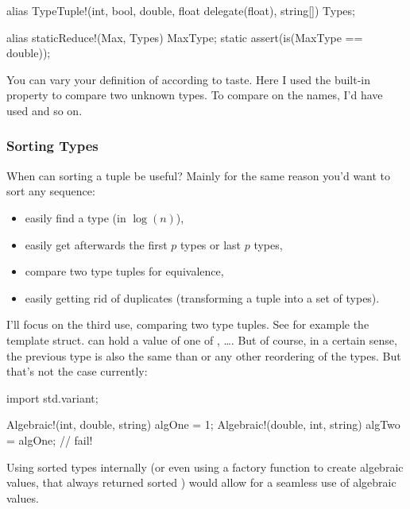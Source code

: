 \begin{dcode}
alias TypeTuple!(int, bool, double, float delegate(float), string[]) Types;

alias staticReduce!(Max, Types) MaxType;
static assert(is(MaxType == double));
\end{dcode}

You can vary your definition of  according to taste. Here I used the built-in  property to compare two unknown types. To compare on the names, I'd have used  and so on.

\subsubsection{Sorting Types}\label{sortingtypes}


When can sorting a tuple be useful? Mainly for the same reason you'd want to sort any sequence:

\begin{itemize}
\item easily find a type (in $\log(n)$),
\item easily get afterwards the first $p$ types or last $p$ types,
\item compare two type tuples for equivalence,
\item easily getting rid of duplicates (transforming a tuple into a set of types).
\end{itemize}

I'll focus on the third use, comparing two type tuples. See for example the  template struct.  can hold a value of one of , \ldots {}. But of course, in a certain sense, the previous type is also the same than  or any other reordering of the types. But that's not the case currently:

\begin{dcode}
import std.variant;

Algebraic!(int, double, string) algOne = 1;
Algebraic!(double, int, string) algTwo = algOne; // fail!
\end{dcode}

Using sorted types internally (or even using a factory function to create algebraic values, that always returned sorted ) would allow for a seamless use of algebraic values.

